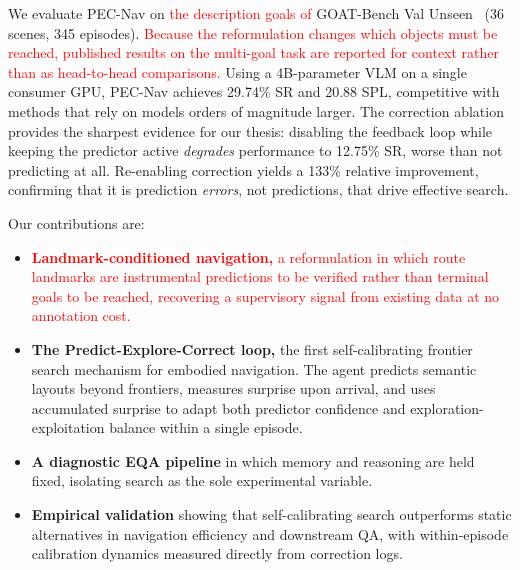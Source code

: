 We evaluate PEC-Nav on \textcolor{red}{the description goals of }GOAT-Bench Val Unseen~\cite{khanna2024goatbench} (36 scenes, 345 episodes). \textcolor{red}{Because the reformulation changes which objects must be reached, published results on the multi-goal task are reported for context rather than as head-to-head comparisons.} Using a 4B-parameter VLM on a single consumer GPU, PEC-Nav achieves 29.74\% SR and 20.88 SPL, competitive with methods that rely on models orders of magnitude larger. The correction ablation provides the sharpest evidence for our thesis: disabling the feedback loop while keeping the predictor active \emph{degrades} performance to 12.75\% SR, worse than not predicting at all. Re-enabling correction yields a 133\% relative improvement, confirming that it is prediction \emph{errors}, not predictions, that drive effective search.

Our contributions are:
\begin{itemize}
    \item \textcolor{red}{\textbf{Landmark-conditioned navigation,} a reformulation in which route landmarks are instrumental predictions to be verified rather than terminal goals to be reached, recovering a supervisory signal from existing data at no annotation cost.}
    \item \textbf{The Predict-Explore-Correct loop,} the first self-calibrating frontier search mechanism for embodied navigation. The agent predicts semantic layouts beyond frontiers, measures surprise upon arrival, and uses accumulated surprise to adapt both predictor confidence and exploration-exploitation balance within a single episode.
    \item \textbf{A diagnostic EQA pipeline} in which memory and reasoning are held fixed, isolating search as the sole experimental variable.
    \item \textbf{Empirical validation} showing that self-calibrating search outperforms static alternatives in navigation efficiency and downstream QA, with within-episode calibration dynamics measured directly from correction logs.
\end{itemize}

